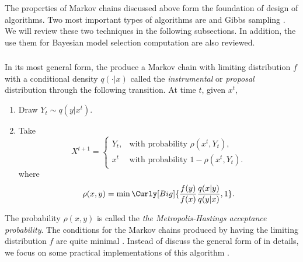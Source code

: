The properties of Markov chains discussed above form the foundation of design
of \mcmc algorithms. Two most important types of \mcmc algorithms are \mha
\parencite{Hastings1970,Metropolis1953} and Gibbs sampling
\parencite{Geman1993}. We will review these two techniques in the following
subsections. In addition, the use them for Bayesian model selection
computation are also reviewed.

\subsubsection{\mha}
\label{ssub:mha}

In its most general form, the \mha produce a Markov chain with limiting
distribution $f$ with a conditional density $q(\cdot|x)$ called the
\emph{instrumental} or \emph{proposal} distribution through the following
transition. At time $t$, given $x^t$,
\begin{enumerate}
  \item Draw $Y_t \sim q(y|x^t)$.
  \item Take
    \[
      X^{t+1} = \begin{cases}
        Y_t, &\text{with probability } \rho(x^t,Y_t),\\
        x^t  &\text{with probability } 1 - \rho(x^t,Y_t).
      \end{cases}
    \]
    where
    \begin{equation}
      \rho(x,y) = \min\Curly[Big]{\frac{f(y)}{f(x)}\frac{q(x|y)}{q(y|x)},1}.
    \end{equation}
\end{enumerate}
The probability $\rho(x,y)$ is called the \emph{the Metropolis-Hastings
  acceptance probability}. The conditions for the Markov chains produced by
\mha having the limiting distribution $f$ are quite minimal
\parencite[see][chap.~7]{Robert2004}. Instead of discuss the general form of
\mha in details, we focus on some practical implementations of this algorithm
\parencite[also see][for the speed of convergence of the \mha]{Mengersen1996}.

